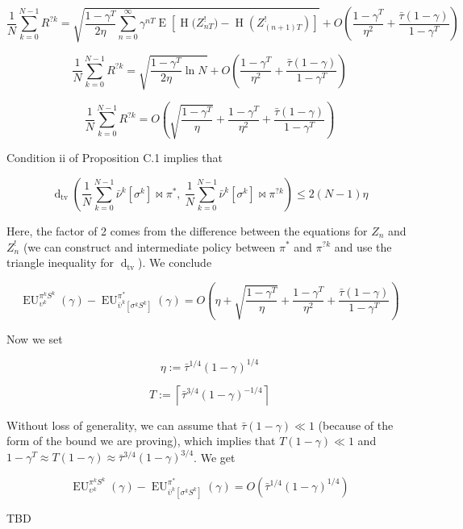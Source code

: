 \documentclass[a4paper]{article}
\newcommand{\AB}[1]{\left[#1\right]}
\newcommand{\E}[1]{\underset{#1}{\operatorname{E}}}
\newcommand{\En}{\operatorname{H}}
\newcommand{\Dtv}{\operatorname{d}_{\text{tv}}}
\newcommand{\Ceil}[1]{\left\lceil #1 \right\rceil}
\newcommand{\EU}{\operatorname{EU}}
\begin{document}
$$\frac{1}{N}\sum_{k=0}^{N-1}R^{?k} = \sqrt{\frac{1-\gamma^T}{2\eta}\sum_{n=0}^\infty \gamma^{nT} \E{}\left[\En\Big(Z^!_{nT}\Big)-\En\left(Z^!_{(n+1)T}\right)\right]} + O\left(\frac{1-\gamma^T}{\eta^2}+\frac{\bar{\tau}(1-\gamma)}{1-\gamma^T}\right)$$

$$\frac{1}{N}\sum_{k=0}^{N-1}R^{?k} = \sqrt{\frac{1-\gamma^T}{2\eta}\ln N} + O\left(\frac{1-\gamma^T}{\eta^2}+\frac{\bar{\tau}(1-\gamma)}{1-\gamma^T}\right)$$

$$\frac{1}{N}\sum_{k=0}^{N-1}R^{?k} = O\left(\sqrt{\frac{1-\gamma^T}{\eta}} +\frac{1-\gamma^T}{\eta^2}+\frac{\bar{\tau}(1-\gamma)}{1-\gamma^T}\right)$$

Condition ii of Proposition C.1 implies that

$$\Dtv\left(\frac{1}{N}\sum_{k=0}^{N-1}{\bar{\nu}^k\left[\sigma^k\right]\bowtie\pi^*},\ \frac{1}{N}\sum_{k=0}^{N-1}{\bar{\nu}^k\left[\sigma^k\right]\bowtie\pi^{?k}}\right) \leq 2(N-1)\eta$$

Here, the factor of 2 comes from the difference between the equations for $Z_n$ and $Z^!_n$ (we can construct and intermediate policy between $\pi^*$ and $\pi^{?k}$ and use the triangle inequality for $\Dtv$). We conclude

$$\EU^{\pi^k S^k}_{\upsilon^k}(\gamma)-\EU^{\pi^{*}}_{\bar{\upsilon}^k\AB{\sigma^k S^k}}(\gamma) = O\left(\eta+\sqrt{\frac{1-\gamma^T}{\eta}} +\frac{1-\gamma^T}{\eta^2}+\frac{\bar{\tau}(1-\gamma)}{1-\gamma^T}\right)$$

Now we set 

$$\eta:=\bar{\tau}^{1/4} (1-\gamma)^{1/4}$$  

$$T:=\Ceil{\bar{\tau}^{3/4}(1-\gamma)^{-1/4}}$$

Without loss of generality, we can assume that $\bar{\tau}(1-\gamma) \ll 1$ (because of the form of the bound we are proving), which implies that $T(1-\gamma) \ll 1$ and $1-\gamma^T \approx T(1-\gamma) \approx \bar{\tau}^{3/4}(1-\gamma)^{3/4}$. We get

$$\EU^{\pi^k S^k}_{\upsilon^k}(\gamma)-\EU^{\pi^{*}}_{\bar{\upsilon}^k\AB{\sigma^k S^k}}(\gamma) = O\left(\bar{\tau}^{1/4}(1-\gamma)^{1/4}\right)$$

TBD
\end{document}
